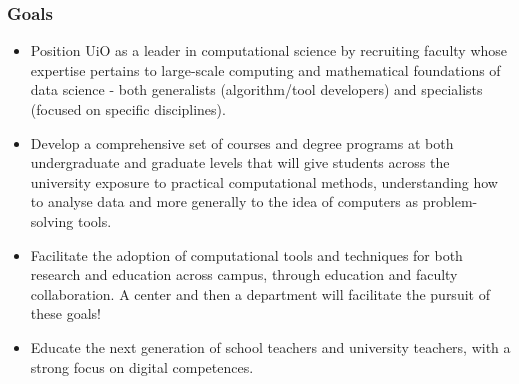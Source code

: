 \documentclass{beamer}
\begin{document}
\begin{frame}
\frametitle{Goals}

\begin{itemize}
\item Position UiO  as a leader in computational science by recruiting faculty whose expertise pertains to large-scale computing and mathematical foundations of data science - both generalists (algorithm/tool developers) and specialists (focused on specific disciplines).	

\item Develop a comprehensive set of courses and degree programs at both undergraduate and graduate levels that will give students across the university exposure to practical computational methods, understanding how to analyse data and more generally to the idea of computers as problem-solving tools.	

\item Facilitate the adoption of computational tools and techniques for both research and education across campus, through education and faculty collaboration. A center and then a department will facilitate the pursuit of these goals!	

\item Educate the next generation of school teachers and university teachers,  with a strong focus on digital competences. 
\end{itemize}

\noindent
\end{frame}
\end{document}
